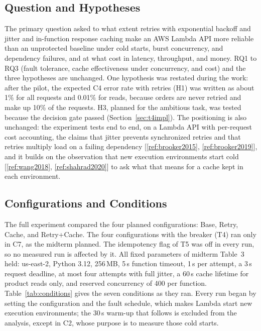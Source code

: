 \documentclass[10pt]{article}
\begin{document}
\subsection{Question and Hypotheses}
The primary question asked to what extent retries with exponential backoff and
jitter and in-function response caching make an AWS Lambda API more reliable
than an unprotected baseline under cold starts, burst concurrency, and
dependency failures, and at what cost in latency, throughput, and money. RQ1
to RQ3 (fault tolerance, cache effectiveness under concurrency, and cost) and
the three hypotheses are unchanged. One hypothesis was restated during the
work: after the pilot, the expected C4 error rate with retries (H1) was
written as about 1\% for all requests and 0.01\% for reads, because orders are
never retried and make up 10\% of the requests. H3, planned for the ambitious
task, was tested because the decision gate passed (Section~\ref{sec:t4impl}).
The positioning is also unchanged: the experiment tests end to end, on a
Lambda API with per-request cost accounting, the claims that jitter prevents
synchronized retries and that retries multiply load on a failing dependency
[\ref{ref:brooker2015}, \ref{ref:brooker2019}], and it builds on the
observation that new execution environments start cold
[\ref{ref:wang2018}, \ref{ref:shahrad2020}] to ask what that means for a cache
kept in each environment.

\subsection{Configurations and Conditions}
The full experiment compared the four planned configurations: Base, Retry,
Cache, and Retry+Cache. The four configurations with the breaker (T4) ran only
in C7, as the midterm planned. The idempotency flag of T5 was off in every
run, so no measured run is affected by it. All fixed parameters of midterm
Table~3 held: us-east-2, Python 3.12, 256\,MB, 5\,s function timeout, 1\,s per
attempt, a 3\,s request deadline, at most four attempts with full jitter, a
60\,s cache lifetime for product reads only, and reserved concurrency of 400
per function. Table~\ref{tab:conditions} gives the seven conditions as they
ran. Every run began by setting the configuration and the fault schedule,
which makes Lambda start new execution environments; the 30\,s warm-up that
follows is excluded from the analysis, except in C2, whose purpose is to
measure those cold starts.
\end{document}
